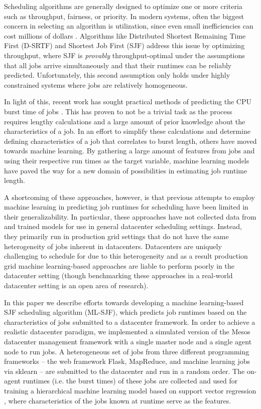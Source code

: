 \documentclass{hotnets19}
\begin{document}
Scheduling algorithms are generally designed to optimize one or more criteria such as throughput, fairness, or priority. In modern systems, often the biggest concern in selecting an algorithm is utilization, since even small inefficiencies can cost millions of dollars \cite{Forbes2014}. Algorithms like Distributed Shortest Remaining Time First (D-SRTF) and Shortest Job First (SJF) address this issue by optimizing throughput, where SJF is \emph{provably} throughput-optimal under the assumptions that all jobs arrive simultaneously and that their runtimes can be reliably predicted. Unfortunately, this second assumption only holds under highly constrained systems where jobs are relatively homogeneous.

In light of this, recent work has sought practical methods of predicting the CPU burst time of jobs \cite{slaq, onlinescheduling, dualsimplex}. This has proven to not be a trivial task as the process requires lengthy calculations and a large amount of prior knowledge about the characteristics of a job. In an effort to simplify these calculations and determine defining characteristics of a job that correlates to burst length, others have moved towards machine learning. By gathering a large amount of features from jobs and using their respective run times as the target variable, machine learning models have paved the way for a new domain of possibilities in estimating job runtime length.

A shortcoming of these approaches, however, is that previous attempts to employ machine learning in predicting job runtimes for scheduling have been limited in their generalizability. In particular, these approaches have not collected data from and trained models for use in general datacenter scheduling settings. Instead, they primarily run in production grid settings that do not have the same heterogeneity of jobs inherent in datacenters. Datacenters are uniquely challenging to schedule for due to this heterogeneity and as a result production grid machine learning-based approaches are liable to perform poorly in the datacenter setting (though benchmarking these approaches in a real-world datacenter setting is an open area of research).

In this paper we describe efforts towards developing a machine learning-based SJF scheduling algorithm (ML-SJF), which predicts job runtimes based on the characteristics of jobs submitted to a datacenter framework. In order to achieve a realistic datacenter paradigm, we implemented a simulated version of the Mesos datacenter management framework \cite{hindman2011mesos} with a single master node and a single agent node to run jobs. A heterogeneous set of jobs from three different programming frameworks -- the web framework Flask, MapReduce, and machine learning jobs via sklearn \cite{scikit-learn} -- are submitted to the datacenter and run in a random order. The on-agent runtimes (i.e. the burst times) of these jobs are collected and used for training a hierarchical machine learning model based on support vector regression \cite{chang2011libsvm}, where characteristics of the jobs known at runtime serve as the features.
\end{document}
